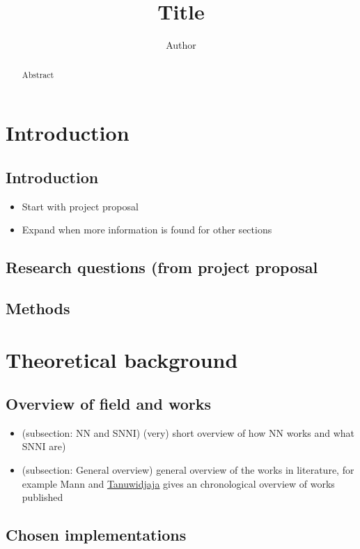 \documentclass[twoside]{Style/uva-inf-bachelor-thesis}
\title{Title}
\author{Author}
\begin{document}
\maketitle

\begin{abstract}
Abstract
\end{abstract}

\tableofcontents

\chapter{Introduction}
\section{Introduction}
\begin{itemize}
    \item Start with project proposal
    \item Expand when more information is found for other sections
\end{itemize}
\section{Research questions (from project proposal}
\section{Methods}
% 
% 

\chapter{Theoretical background}
\section{Overview of field and works}
\begin{itemize}
    \item (subsection: NN and SNNI) (very) short overview of how NN works and what SNNI are)
    \item (subsection: General overview) general overview of the works in literature, for example Mann and \href{https://ieeexplore.ieee.org/stamp/stamp.jsp?tp=&arnumber=9194237}{Tanuwidjaja} gives an chronological overview of works published
\end{itemize}
\section{Chosen implementations}
\end{document}
